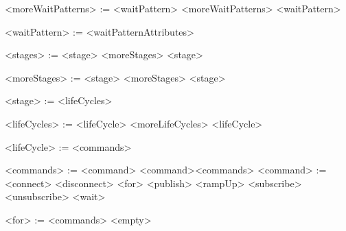 \begin{grammar}
	<moreWaitPatterns> := <waitPattern> <moreWaitPatterns>
						\alt <waitPattern>
						
	<waitPattern>	:= <waitPatternAttributes>

	<stages> := <stage> <moreStages>
				\alt <stage>
				
	<moreStages> := <stage> <moreStages>
				\alt <stage>
					
	<stage>		:= <lifeCycles>
	
	<lifeCycles> := <lifeCycle> <moreLifeCycles>
				
	<lifeCycle>  := <commands>
	
	<commands> := <command>
				\alt <command><commands>
	<command> := <connect> \alt <disconnect> \alt <for> \alt <publish> \alt <rampUp> \alt <subscribe> \alt <unsubscribe> \alt <wait>
	
	<for> := <commands> \alt <empty>
\end{grammar}